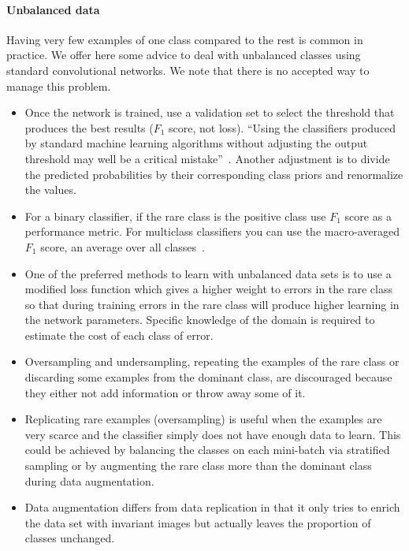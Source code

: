 \paragraph{Unbalanced data}
Having very few examples of one class compared to the rest is common in practice. We offer here some advice to deal with unbalanced classes using standard convolutional networks. We note that there is no accepted way to manage this problem.
\begin{itemize}
	\item Once the network is trained, use a validation set to select the threshold that produces the best results ($F_1$ score, not loss). ``Using the classifiers produced by standard machine learning algorithms without adjusting the output threshold may well be a critical mistake''~\cite{Provost2000}. Another adjustment is to divide the predicted probabilities by their corresponding class priors and renormalize the values. 

	\item For a binary classifier, if the rare class is the positive class use $F_1$ score as a performance metric. For multiclass classifiers you can use the macro-averaged $F_1$ score, an average over all classes~\cite{Ozgur2005}.

	\item One of the preferred methods to learn with unbalanced data sets is to use a modified loss function which gives a higher weight to errors in the rare class so that during training errors in the rare class will produce higher learning in the network parameters. Specific knowledge of the domain is required to estimate the cost of each class of error.

	\item Oversampling and undersampling, repeating the examples of the rare class or discarding some examples from the dominant class, are discouraged because they either not add information or throw away some of it.

	\item Replicating rare examples (oversampling) is useful when the examples are very scarce and the classifier simply does not have enough data to learn. This could be achieved by balancing the classes on each mini-batch via stratified sampling or by augmenting the rare class more than the dominant class during data augmentation.

	\item Data augmentation differs from data replication in that it only tries to enrich the data set with invariant images but actually leaves the proportion of classes unchanged.
\end{itemize}

